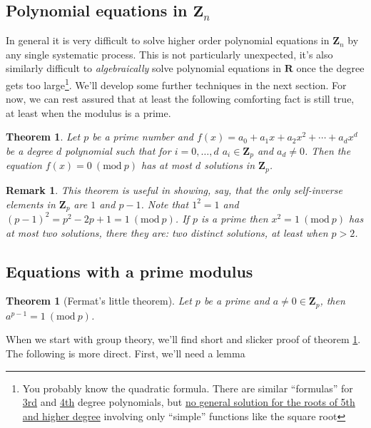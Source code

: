 \documentclass[12pt]{article}
\numberwithin{equation}{subsection}
\newtheorem{thm}[subsection]{Theorem}
\theoremstyle{note}
\newtheorem{remark}[subsection]{Remark}
\newcommand{\Mod}[1]{\ (\mathrm{mod}\ #1)}
\begin{document}
\subsection{Polynomial equations in $\mathbf{Z}_n$}
In general it is very difficult to solve higher order polynomial equations in $\mathbf{Z}_n$ by any single systematic process. This is not particularly unexpected, it's also similarly difficult to \textit{algebraically} solve polynomial equations in $\mathbf{R}$ once the degree gets too large\footnote{You probably know the quadratic formula. There are similar ``formulas'' for \href{https://en.wikipedia.org/wiki/Cubic_equation\#General_cubic_formula}{3rd} and \href{https://en.wikipedia.org/wiki/Quartic_equation\#The_general_case}{4th} degree polynomials, but \href{https://en.wikipedia.org/wiki/Abe\%E2\%80\%93Ruffini_theorem}{no general solution for the roots of 5th and higher degree} involving only ``simple'' functions like the square root}. We'll develop some further techniques in the next section. For now, we can rest assured that at least the following comforting fact is still true, at least when the modulus is a prime.

\begin{thm}\label{prime-roots}
Let $p$ be a prime number and $f(x)=a_0+a_1x+a_2x^2+\cdots+a_dx^d$ be a degree $d$ polynomial such that for $i=0,\dots,d$ $a_i\in\mathbf{Z}_p$ and $a_d\neq 0$. Then the equation $f(x)=0\Mod{p}$ has at most $d$ solutions in $\mathbf{Z}_p$. 

\end{thm}

\begin{remark} This theorem is useful in showing, say, that the only self-inverse elements in $\mathbf{Z}_p$ are $1$ and $p-1$. Note that $1^2=1$ and $(p-1)^2=p^2-2p+1=1\Mod{p}$. If $p$ is a prime then $x^2=1\Mod{p}$ has at most two solutions, there they are: two distinct solutions, at least when $p>2$.
\end{remark}
\subsection{Equations with a prime modulus}


\begin{thm}[Fermat's little theorem]\label{flt}
	Let $p$ be a prime and $a\neq 0\in\mathbf{Z}_p$, then $a^{p-1}=1\Mod{p}$.
\end{thm}

When we start with group theory, we'll find short and slicker proof of theorem \ref{flt}. The following is more direct. First, we'll need a lemma
\end{document}
